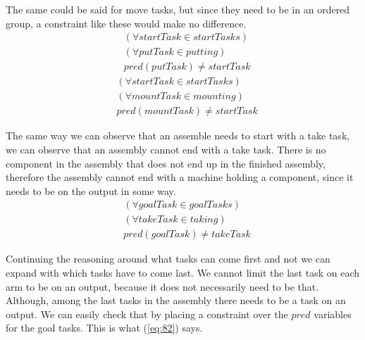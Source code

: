     The same could be said for move tasks, but since they need to be in an ordered group, a constraint like these would make no difference.
  \begin{equation}\label{eq:79}
  \begin{aligned}
  &(\forall startTask \in startTasks)\\
  &(\forall putTask \in putting)\\
  &pred(putTask) \neq startTask
  \end{aligned}
  \end{equation}
  \begin{equation}\label{eq:80}
   \begin{aligned}
   &(\forall startTask \in startTasks)\\
   &(\forall mountTask \in mounting)\\
   &pred(mountTask) \neq startTask 
   \end{aligned}
  \end{equation}

   \noindent The same way we can observe that an assemble needs to start with a take task, we can observe that an assembly cannot end with a take task. There is no component in the assembly that does not end up in the finished assembly, therefore the assembly cannot end with a machine holding a component, since it needs to be on the output in some way.
  \begin{equation}\label{eq:81}
  \begin{aligned}
  &(\forall goalTask \in goalTasks) \\
  &(\forall takeTask \in taking) \\
  &pred(goalTask) \neq takeTask
  \end{aligned}
  \end{equation}
 
  \noindent Continuing the reasoning around what tasks can come first and not we can expand with which tasks have to come last. We cannot limit the last task on each arm to be on an output, because it does not necessarily need to be that. Although, among the last tasks in the assembly there needs to be a task on an output. We can easily check that by placing a constraint over the $pred$ variables for the goal tasks. This is what (\ref{eq:82}) says.
   

